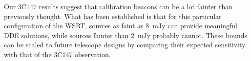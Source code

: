 \documentclass[]{aa}
\begin{document}
Our 3C147 results suggest that calibration beacons can be a lot fainter than previously thought. What has been established is that for this particular configuration of the WSRT, sources as faint as 8~mJy can provide meaningful DDE solutions, while sources fainter than 2~mJy probably cannot. These bounds can be scaled to future telescope designs by comparing their expected sensitivity with that of the 3C147 observation.





\end{document}
